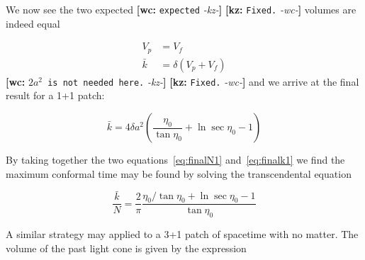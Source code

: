 \documentclass[preprint,notitlepage,amsmath,amssymb,floatfix]{revtex4-1}
\newcommand{\XXX}[3]{{\bf [#1: } {\tt #3} {\it -#2-}{\bf ]}}
\begin{document}
\noindent We now see the two expected \XXX{wc}{kz}{expected} \XXX{kz}{wc}{Fixed.} volumes are indeed equal

\begin{align}
V_p &= V_f \\
\bar{k} &= \delta\left( V_p + V_f \right)
\end{align}
\XXX{wc}{kz}{$2a^2$ is not needed here.} \XXX{kz}{wc}{Fixed.}
\noindent and we arrive at the final result for a 1+1 patch:

\begin{equation}
\label{eq:finalk1}
\bar k = 4 \delta a^2 \left( \frac{\eta_0}{\tan\eta_0} + \ln\sec\eta_0 - 1 \right)
\end{equation}

\noindent By taking together the two equations~\eqref{eq:finalN1} and~\eqref{eq:finalk1} we find the maximum conformal time may be found by solving the transcendental equation

\begin{equation}
\label{eq:trans1}
\frac{\bar k}{N} = \frac{2}{\pi}\frac{\eta_0 / \tan\eta_0 + \ln\sec\eta_0 - 1}{\tan\eta_0}
\end{equation}

\noindent A similar strategy may applied to a 3+1 patch of spacetime with no matter.  The volume of the past light cone is given by the expression
\end{document}
